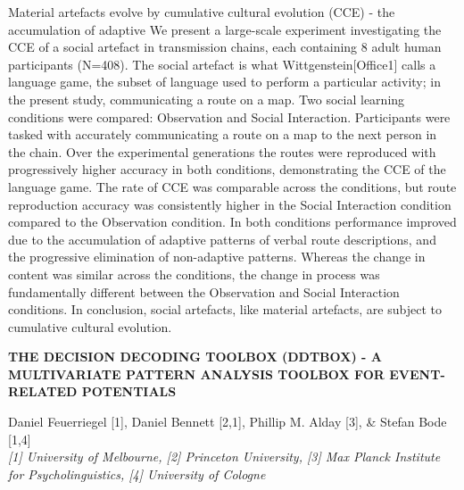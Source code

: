 \documentclass[]{article}
\begin{document}
Material artefacts evolve by cumulative cultural evolution (CCE) - the
accumulation of adaptive We present a large-scale experiment
investigating the CCE of a social artefact in transmission chains, each
containing 8 adult human participants (N=408). The social artefact is
what Wittgenstein{[}Office1{]} calls a language game, the subset of
language used to perform a particular activity; in the present study,
communicating a route on a map. Two social learning conditions were
compared: Observation and Social Interaction. Participants were tasked
with accurately communicating a route on a map to the next person in the
chain. Over the experimental generations the routes were reproduced with
progressively higher accuracy in both conditions, demonstrating the CCE
of the language game. The rate of CCE was comparable across the
conditions, but route reproduction accuracy was consistently higher in
the Social Interaction condition compared to the Observation condition.
In both conditions performance improved due to the accumulation of
adaptive patterns of verbal route descriptions, and the progressive
elimination of non-adaptive patterns. Whereas the change in content was
similar across the conditions, the change in process was fundamentally
different between the Observation and Social Interaction conditions. In
conclusion, social artefacts, like material artefacts, are subject to
cumulative cultural evolution.\\
\pagebreak  

\textbf{THE DECISION DECODING TOOLBOX (DDTBOX) - A MULTIVARIATE PATTERN
ANALYSIS TOOLBOX FOR EVENT-RELATED POTENTIALS}

Daniel Feuerriegel {[}1{]}, Daniel Bennett {[}2,1{]}, Phillip M. Alday
{[}3{]}, \& Stefan Bode {[}1,4{]}\\
\emph{{[}1{]} University of Melbourne, {[}2{]} Princeton University,
{[}3{]} Max Planck Institute for Psycholinguistics, {[}4{]} University
of Cologne}
\end{document}
